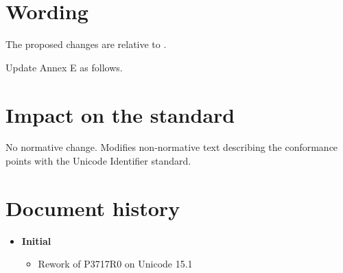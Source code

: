 \documentclass[a4paper,10pt,oneside,openany,final,article]{memoir}
\begin{document}
\chapter{Wording}

The proposed changes are relative to \cite{N5008}.

Update Annex E as follows.

\begin{wording}



\end{wording}

\chapter{Impact on the standard}

No normative change. Modifies non-normative text describing the conformance points with the Unicode Identifier standard.

\chapter*{Document history}

\begin{itemize}
\item \textbf{Initial}
  \begin{itemize}
  \item Rework of P3717R0 on Unicode 15.1
  \end{itemize}
\end{itemize}

\renewcommand{\bibname}{References}


\end{document}
